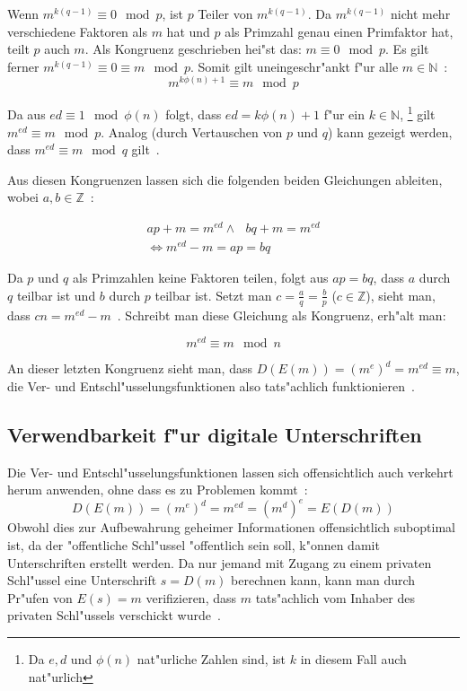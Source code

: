 \documentclass[12pt]{article}
\begin{document}
Wenn $m^{k(q-1)} \equiv 0 \mod p$, ist $p$ Teiler von $m^{k(q-1)}$.
Da $m^{k(q-1)}$ nicht mehr verschiedene Faktoren als $m$ hat und $p$ als Primzahl
genau einen Primfaktor hat, teilt $p$ auch $m$.
Als Kongruenz geschrieben hei"st das: $m \equiv 0 \mod p$.
Es gilt ferner $m^{k(q-1)} \equiv 0 \equiv m \mod p$.
Somit gilt uneingeschr"ankt f"ur alle $m \in \mathbb{N}$~\cite{rsa}:
\[m^{k\phi(n)+1} \equiv m \mod p\]

Da aus $ed \equiv 1 \mod \phi(n)$ folgt, dass $ed = k\phi(n) +1$ f"ur ein $k \in \mathbb{N}$,%
\footnote{Da $e, d$ und $\phi(n)$ nat"urliche Zahlen sind, ist $k$ in diesem Fall auch nat"urlich}
gilt $m^{ed} \equiv m \mod p$.
Analog (durch Vertauschen von $p$ und $q$) kann gezeigt werden,
dass $m^{ed} \equiv m \mod q$ gilt~\cite{rsa}.

Aus diesen Kongruenzen lassen sich die folgenden beiden Gleichungen ableiten,
wobei $a, b \in \mathbb{Z}$~\cite{pii1}:

\[
\begin{aligned}
ap + m = m^{ed} \land ~~~ bq + m = m^{ed} \\
\iff m^{ed} - m = ap = bq
\end{aligned}
\]

Da $p$ und $q$ als Primzahlen keine Faktoren teilen, folgt aus $ap = bq$,
dass $a$ durch $q$ teilbar ist und $b$ durch $p$ teilbar ist.
Setzt man $c = \frac{a}{q} = \frac{b}{p}$ ($c \in \mathbb{Z}$),
sieht man, dass $cn = m^{ed} - m$~\cite{pii1}.
Schreibt man diese Gleichung als Kongruenz, erh"alt man:

\[
m^{ed} \equiv m \mod n
\]

An dieser letzten Kongruenz sieht man, dass $D(E(m)) = (m^e)^d = m^{ed} \equiv m$,
die Ver- und Entschl"usselungsfunktionen also tats"achlich funktionieren~\cite{rsa}.

\subsection{Verwendbarkeit f"ur digitale Unterschriften}

Die Ver- und Entschl"usselungsfunktionen lassen sich offensichtlich
auch verkehrt herum anwenden, ohne dass es zu Problemen kommt~\cite{rsa}:
\[D(E(m)) = (m^e)^d = m^{ed} = (m^d)^e = E(D(m))\]
Obwohl dies zur Aufbewahrung geheimer Informationen offensichtlich suboptimal ist,
da der "offentliche Schl"ussel "offentlich sein soll, k"onnen damit Unterschriften erstellt werden.
Da nur jemand mit Zugang zu einem privaten Schl"ussel eine Unterschrift $s = D(m)$ berechnen kann,
kann man durch Pr"ufen von $E(s) = m$ verifizieren, dass $m$ tats"achlich vom
Inhaber des privaten Schl"ussels verschickt wurde~\cite{rsa}.
\end{document}
